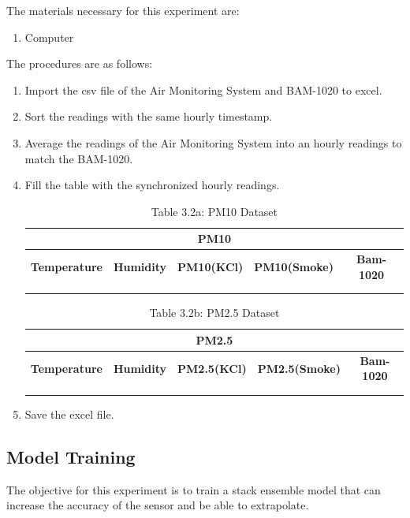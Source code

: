 \noindent The materials necessary for this experiment are:
\begin{enumerate}
	\item Computer
\end{enumerate}

\noindent The procedures are as follows:
\begin{enumerate}
	\item Import the csv file of the Air Monitoring System and BAM-1020 to excel.
	\item Sort the readings with the same hourly timestamp.
	\item Average the readings of the Air Monitoring System into an hourly readings to match the BAM-1020.
	\item Fill the table with the synchronized hourly readings.
	
	\begin{table}[htbp]
		\centering
		\renewcommand{\arraystretch}{1.3}
		\begin{tabular}{|c|c|c|c|c|}
			\hline
			\multicolumn{5}{|c|}{\textbf{PM10}} \\ \hline
			\textbf{Temperature} & \textbf{Humidity} & \textbf{PM10(KCl)} & \textbf{PM10(Smoke)} & \textbf{Bam-1020} \\ \hline
			& & & & \\ \hline
			& & & & \\ \hline
		\end{tabular}
		\caption{Table 3.2a: PM10 Dataset}
		\label{tab:sync_pm10}
	\end{table}
	
	\begin{table}[htbp]
		\centering
		\renewcommand{\arraystretch}{1.3}
		\begin{tabular}{|c|c|c|c|c|}
			\hline
			\multicolumn{5}{|c|}{\textbf{PM2.5}} \\ \hline
			\textbf{Temperature} & \textbf{Humidity} & \textbf{PM2.5(KCl)} & \textbf{PM2.5(Smoke)} & \textbf{Bam-1020} \\ \hline
			& & & & \\ \hline
			& & & & \\ \hline
		\end{tabular}
		\caption{Table 3.2b: PM2.5 Dataset}
		\label{tab:sync_pm25}
	\end{table}
	
	\item Save the excel file.
\end{enumerate}

\subsection{Model Training}
The objective for this experiment is to train a stack ensemble model that can increase the accuracy of the sensor and be able to extrapolate.


